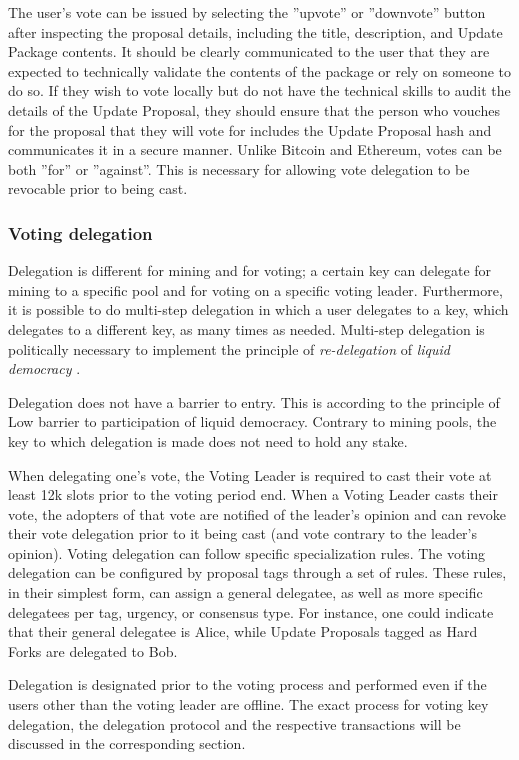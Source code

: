 The user's vote can be issued by selecting the ''upvote'' or ''downvote'' button after inspecting the proposal details, including the title, description, and Update Package contents. It should be clearly communicated to the user that they are expected to technically validate the contents of the package or rely on someone to do so. If they wish to vote locally but do not have the technical skills to audit the details of the Update Proposal, they should ensure that the person who vouches for the proposal that they will vote for includes the Update Proposal hash and communicates it in a secure manner. Unlike Bitcoin and Ethereum, votes can be both ''for'' or ''against''. This is necessary for allowing vote delegation to be revocable prior to being cast.

\subsubsection*{Voting delegation}

Delegation is different for mining and for voting; a certain key can delegate for mining to a specific pool and for voting on a specific voting leader. Furthermore, it is possible to do multi-step delegation in which a user delegates to a key, which delegates to a different key, as many times as needed. Multi-step delegation is politically necessary to implement the principle of \emph{re-delegation} of \emph{liquid democracy} \cite{liqdemocracy}.

Delegation does not have a barrier to entry. This is according to the principle of Low barrier to participation of liquid democracy. Contrary to mining pools, the key to which delegation is made does not need to hold any stake.

When delegating one's vote, the Voting Leader is required to cast their vote at least 12k slots prior to the voting period end. When a Voting Leader casts their vote, the adopters of that vote are notified of the leader's opinion and can revoke their vote delegation prior to it being cast (and vote contrary to the leader's opinion).
Voting delegation can follow specific specialization rules. The voting delegation can be configured by proposal tags through a set of rules. These rules, in their simplest form, can assign a general delegatee, as well as more specific delegatees per tag, urgency, or consensus type. For instance, one could indicate that their general delegatee is Alice, while Update Proposals tagged as Hard Forks are delegated to Bob.

Delegation is designated prior to the voting process and performed even if the users other than the voting leader are offline. The exact process for voting key delegation, the delegation protocol and the respective transactions will be discussed in the corresponding section.

